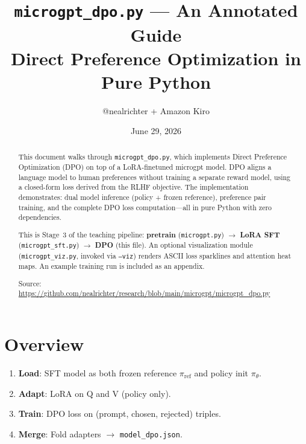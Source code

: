 \documentclass[11pt,a4paper]{article}
\title{\texttt{microgpt\_dpo.py} --- An Annotated Guide\\[0.3em]
\large Direct Preference Optimization in Pure Python}
\author{@nealrichter + Amazon Kiro}
\date{June 29, 2026}
\begin{document}
\pagestyle{fancy}
\fancyhf{}
\fancyfoot[C]{\thepage}
\maketitle

\begin{abstract}
This document walks through \texttt{microgpt\_dpo.py}, which implements Direct Preference Optimization (DPO) on top of a LoRA-finetuned microgpt model. DPO aligns a language model to human preferences without training a separate reward model, using a closed-form loss derived from the RLHF objective. The implementation demonstrates: dual model inference (policy + frozen reference), preference pair training, and the complete DPO loss computation---all in pure Python with zero dependencies.

This is Stage~3 of the teaching pipeline: \textbf{pretrain} (\texttt{microgpt.py}) $\to$ \textbf{LoRA SFT} (\texttt{microgpt\_sft.py}) $\to$ \textbf{DPO} (this file). An optional visualization module (\texttt{microgpt\_viz.py}, invoked via \texttt{--viz}) renders ASCII loss sparklines and attention heat maps. An example training run is included as an appendix.

\medskip
\noindent Source: \url{https://github.com/nealrichter/research/blob/main/microgpt/microgpt_dpo.py}
\end{abstract}

\tableofcontents

\section{Overview}

\begin{enumerate}
  \item \textbf{Load}: SFT model as both frozen reference $\pi_{\text{ref}}$ and policy init $\pi_\theta$.
  \item \textbf{Adapt}: LoRA on Q and V (policy only).
  \item \textbf{Train}: DPO loss on (prompt, chosen, rejected) triples.
  \item \textbf{Merge}: Fold adapters $\to$ \texttt{model\_dpo.json}.
\end{enumerate}
\end{document}
